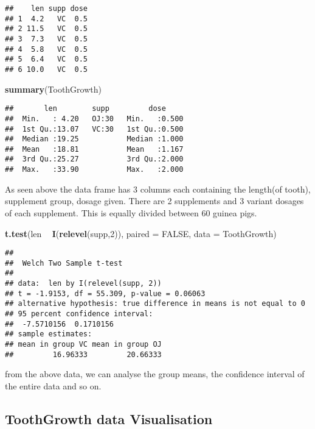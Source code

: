 \documentclass[
]{article}
\newenvironment{Shaded}{\begin{snugshade}}{\end{snugshade}}
\newcommand{\DataTypeTok}[1]{\textcolor[rgb]{0.13,0.29,0.53}{#1}}
\newcommand{\DecValTok}[1]{\textcolor[rgb]{0.00,0.00,0.81}{#1}}
\newcommand{\KeywordTok}[1]{\textcolor[rgb]{0.13,0.29,0.53}{\textbf{#1}}}
\newcommand{\NormalTok}[1]{#1}
\newcommand{\OperatorTok}[1]{\textcolor[rgb]{0.81,0.36,0.00}{\textbf{#1}}}
\newcommand{\OtherTok}[1]{\textcolor[rgb]{0.56,0.35,0.01}{#1}}
\newcommand{\StringTok}[1]{\textcolor[rgb]{0.31,0.60,0.02}{#1}}
\begin{document}
\begin{verbatim}
##    len supp dose
## 1  4.2   VC  0.5
## 2 11.5   VC  0.5
## 3  7.3   VC  0.5
## 4  5.8   VC  0.5
## 5  6.4   VC  0.5
## 6 10.0   VC  0.5
\end{verbatim}

\begin{Shaded}
\begin{Highlighting}[]
\KeywordTok{summary}\NormalTok{(ToothGrowth)}
\end{Highlighting}
\end{Shaded}

\begin{verbatim}
##       len        supp         dose      
##  Min.   : 4.20   OJ:30   Min.   :0.500  
##  1st Qu.:13.07   VC:30   1st Qu.:0.500  
##  Median :19.25           Median :1.000  
##  Mean   :18.81           Mean   :1.167  
##  3rd Qu.:25.27           3rd Qu.:2.000  
##  Max.   :33.90           Max.   :2.000
\end{verbatim}

As seen above the data frame has 3 columns each containing the length(of
tooth), supplement group, dosage given. There are 2 supplements and 3
variant dosages of each supplement. This is equally divided between 60
guinea pigs.

\begin{Shaded}
\begin{Highlighting}[]
\KeywordTok{t.test}\NormalTok{(len }\OperatorTok{~}\StringTok{ }\KeywordTok{I}\NormalTok{(}\KeywordTok{relevel}\NormalTok{(supp,}\DecValTok{2}\NormalTok{)), }\DataTypeTok{paired =} \OtherTok{FALSE}\NormalTok{, }\DataTypeTok{data =}\NormalTok{ ToothGrowth)}
\end{Highlighting}
\end{Shaded}

\begin{verbatim}
## 
##  Welch Two Sample t-test
## 
## data:  len by I(relevel(supp, 2))
## t = -1.9153, df = 55.309, p-value = 0.06063
## alternative hypothesis: true difference in means is not equal to 0
## 95 percent confidence interval:
##  -7.5710156  0.1710156
## sample estimates:
## mean in group VC mean in group OJ 
##         16.96333         20.66333
\end{verbatim}

from the above data, we can analyse the group means, the confidence
interval of the entire data and so on.

\hypertarget{toothgrowth-data-visualisation}{%
\subsection{ToothGrowth data
Visualisation}\label{toothgrowth-data-visualisation}}
\end{document}
